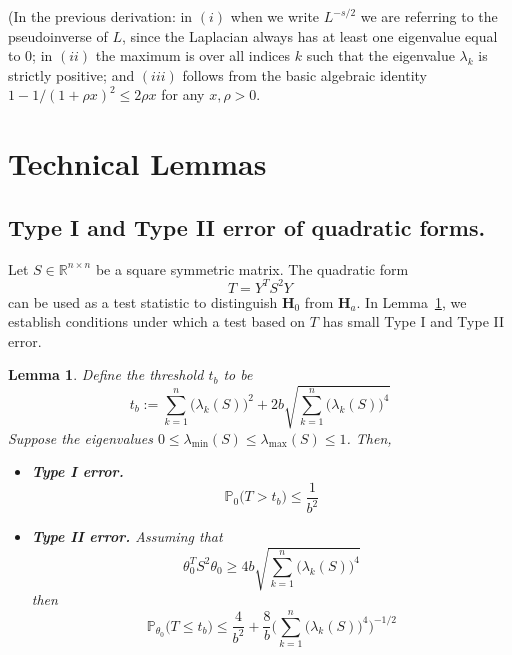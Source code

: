 \documentclass{article}
\newcommand{\Reals}{\mathbb{R}}
\newcommand{\1}{\mathbf{1}}
\newcommand{\Lap}{L}
\newcommand{\Pbb}{\mathbb{P}}
\theoremstyle{alden}
\theoremstyle{aldenthm}
\newtheorem{lemma}{Lemma}
\theoremstyle{definition}
\theoremstyle{remark}
\begin{document}
(In the previous derivation: in $(i)$ when we write $\Lap^{-s/2}$ we are referring to the pseudoinverse of $\Lap$, since the Laplacian always has at least one eigenvalue equal to $0$; in $(ii)$ the maximum is over all indices $k$ such that the eigenvalue $\lambda_k$ is strictly positive; and $(iii)$ follows from the basic algebraic identity $1 - 1/(1 + \rho x)^2 \leq 2 \rho x$ for any $x, \rho > 0$.

\section{Technical Lemmas}

\subsection{Type I and Type II error of quadratic forms.}
Let $S \in \Reals^{n \times n}$ be a square symmetric matrix. The quadratic form
\begin{equation}
T = Y^T S^2 Y
\end{equation}
can be used as a test statistic to distinguish $\mathbf{H}_0$ from $\mathbf{H}_a$. In Lemma~\ref{lem:linear_smoother_fixed_graph_testing}, we establish conditions under which a test based on $T$ has small Type I and Type II error.
\begin{lemma}
	\label{lem:linear_smoother_fixed_graph_testing}
	Define the threshold $t_b$ to be 
	\begin{equation}
	t_{b} := \sum_{k = 1}^{n} \bigl(\lambda_k(S)\bigr)^2 + 2b \sqrt{\sum_{k = 1}^{n} \bigl(\lambda_k(S)\bigr)^4}
	\end{equation}
	Suppose the eigenvalues $0 \leq \lambda_{\min}(S) \leq \lambda_{\max}(S) \leq 1$. Then,
	\begin{itemize}
		\item \textbf{Type I error.}
		\begin{equation}
		\label{eqn:linear_smoother_fixed_graph_testing_typeI}
		\Pbb_0\bigl(T > t_b\bigr) \leq \frac{1}{b^2}
		\end{equation}
		\item \textbf{Type II error.} Assuming that
		\begin{equation}
		\label{eqn:linear_smoother_fixed_graph_testing_critical_radius}
		\theta_0^T S^2 \theta_0 \geq 4b \sqrt{\sum_{k = 1}^{n} \bigl(\lambda_k(S)\bigr)^4}
		\end{equation}
		then
		\begin{equation}
		\label{eqn:linear_smoother_fixed_graph_testing_typeII}
		\Pbb_{\theta_0}\bigl(T \leq t_b\bigr) \leq \frac{4}{b^2} + \frac{8}{b} \Biggl(\sum_{k = 1}^{n}\bigl(\lambda_k(S)\bigr)^4\Biggr)^{-1/2}
		\end{equation}
	\end{itemize}
\end{lemma}
\end{document}

